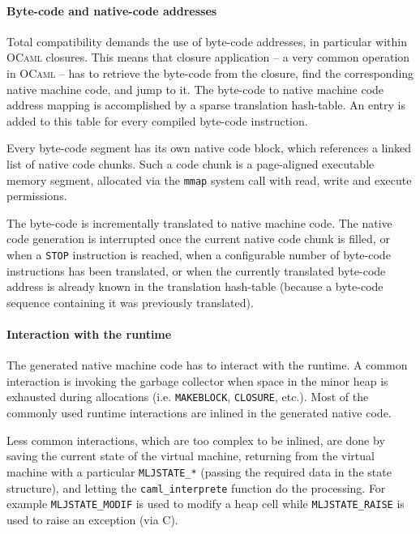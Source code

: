 \documentclass[10pt,a4paper,twocolumn]{article}
\begin{document}
\paragraph{Byte-code and native-code addresses}

Total compatibility demands the use of byte-code addresses, in particular within \textsc{OCaml}
closures. This means that closure application -- a very common operation in \textsc{OCaml} -- has
to retrieve the byte-code from the closure, find the corresponding native machine code, and jump to
it. The byte-code to native machine code address mapping is accomplished by a sparse 
translation hash-table. An entry is added to this table for every compiled byte-code instruction.

Every byte-code segment has its own native code block, which references a linked list of native
code chunks. Such a code chunk is a page-aligned executable memory segment, allocated via the
\texttt{mmap} system call with read, write and execute permissions.

The byte-code is incrementally translated to native machine code. The native code generation is
interrupted once the current native code chunk is filled, or when a \texttt{STOP} instruction is
reached, when a configurable number of byte-code instructions has been translated, or when the
currently translated byte-code address is already known in the translation hash-table
(because a byte-code sequence containing it was previously translated).

\paragraph{Interaction with the runtime}

The generated native machine code has to interact with the runtime. A common interaction is
invoking the garbage collector when space in the minor heap is exhausted during allocations
(i.e. \texttt{MAKEBLOCK}, \texttt{CLOSURE}, etc.). Most of the commonly used runtime interactions
are inlined in the generated native code.

Less common interactions, which are too complex to be inlined, are done by saving the current
state of the virtual machine, returning from the virtual machine with a particular
\texttt{MLJSTATE\_*} (passing the required data in the state structure), and letting the
\texttt{caml\_interprete} function do the processing. For example \texttt{MLJSTATE\_MODIF} is
used to modify a heap cell while \texttt{MLJSTATE\_RAISE} is used to raise an exception (via C).
\end{document}
